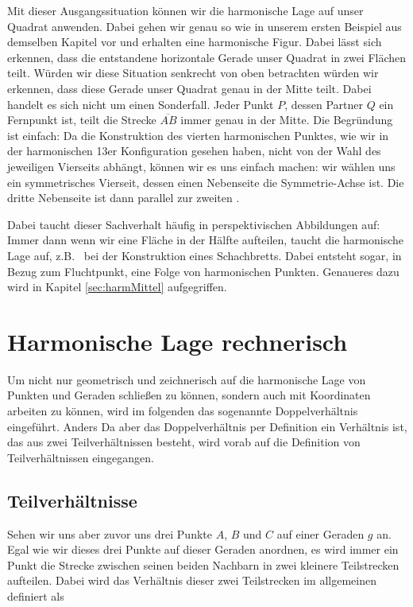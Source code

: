 \documentclass[12pt,a4paper]{article}
\begin{document}
Mit dieser Ausgangssituation können wir die harmonische Lage auf unser Quadrat anwenden. Dabei gehen wir genau so wie in unserem ersten Beispiel aus demselben Kapitel vor und erhalten eine harmonische Figur. Dabei lässt sich erkennen, dass die entstandene horizontale Gerade unser Quadrat in zwei Flächen teilt. Würden wir diese Situation senkrecht von oben betrachten würden wir erkennen, dass diese Gerade unser Quadrat genau in der Mitte teilt. Dabei handelt es sich nicht um einen Sonderfall. Jeder Punkt $P$, dessen Partner $Q$ ein Fernpunkt ist, teilt die Strecke $\overline{A B}$ immer genau in der Mitte.
\newline
Die Begründung ist einfach: Da die Konstruktion des vierten harmonischen Punktes, wie wir in der harmonischen 13er Konfiguration gesehen haben, nicht von der Wahl des jeweiligen Vierseits abhängt, können wir es uns einfach machen: wir wählen uns ein symmetrisches Vierseit, dessen einen Nebenseite die Symmetrie-Achse ist. Die dritte Nebenseite ist dann parallel zur zweiten \citep[vgl.~][S.~50]{projektiveGeometrie}.

Dabei taucht dieser Sachverhalt häufig in perspektivischen Abbildungen auf: Immer dann wenn wir eine Fläche in der Hälfte aufteilen, taucht die harmonische Lage auf, z.B.~ bei der Konstruktion eines Schachbretts. Dabei entsteht sogar, in Bezug zum Fluchtpunkt, eine Folge von harmonischen Punkten. Genaueres dazu wird in Kapitel \ref{sec:harmMittel} aufgegriffen.

\newpage
\section{Harmonische Lage rechnerisch}
Um nicht nur geometrisch und zeichnerisch auf die harmonische Lage von Punkten und Geraden schließen zu können, sondern auch mit Koordinaten arbeiten zu können, wird im folgenden das sogenannte Doppelverhältnis eingeführt. Anders Da aber das Doppelverhältnis per Definition ein Verhältnis ist, das aus zwei Teilverhältnissen besteht, wird vorab auf die Definition von Teilverhältnissen eingegangen.

\subsection{Teilverhältnisse}
\label{subsec:teilverh}
Sehen wir uns aber zuvor uns drei Punkte $A$, $B$ und $C$ auf einer Geraden $g$ an. Egal wie wir dieses drei Punkte auf dieser Geraden anordnen, es wird immer ein Punkt die Strecke zwischen seinen beiden Nachbarn in zwei kleinere Teilstrecken aufteilen. Dabei wird das Verhältnis dieser zwei Teilstrecken im allgemeinen definiert als
\end{document}
